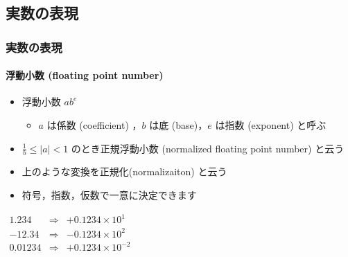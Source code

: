 \subsection{実数の表現}
\begin{frame}[shrink]
\frametitle{実数の表現}
\framesubtitle{浮動小数 (floating point number)}
  \begin{itemize}
\item 浮動小数 \(ab^{e}\)
    \begin{itemize}
\item $a$ は係数 (coefficient) ，$b$ は底 (base)，$e$ は指数 (exponent) と呼ぶ
    \end{itemize}
\item \(\frac{1}{b}\leq|a|<1\) のとき正規浮動小数 (normalized floating point number) と云う
\item 上のような変換を正規化(normalizaiton) と云う
\item 符号，指数，仮数で一意に決定できます
  \end{itemize}
  \begin{example}[正規浮動小数]
   \begin{math}
    \begin{array}{rcl}
1.234 &\Rightarrow& +0.1234\times 10^1\\
-12.34 &\Rightarrow& -0.1234\times 10^2\\
0.01234 &\Rightarrow& +0.1234\times 10^{-2}\\
    \end{array}
   \end{math}
  \end{example}
\end{frame}
